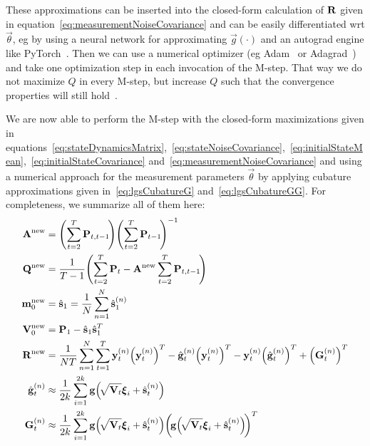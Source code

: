	These approximations can be inserted into the closed-form calculation of \(\boldsymbol{\mathrm{R}}\) given in equation~\eqref{eq:measurementNoiseCovariance} and can be easily differentiated \ac{wrt} \(\vec{\theta}\), \ac{eg} by using a neural network for approximating \(\vec{g}(\cdot)\) and an autograd engine like PyTorch~\cite{paszkePyTorchImperativeStyle2019}. Then we can use a numerical optimizer (\ac{eg} Adam~\cite{kingmaAdamMethodStochastic2017} or Adagrad~\cite{duchiAdaptiveSubgradientMethods2011}) and take one optimization step in each invocation of the M-step. That way we do not maximize \(Q\) in every M-step, but increase \(Q\) such that the convergence properties will still hold~\cite{moonExpectationmaximizationAlgorithm1996}.

	We are now able to perform the M-step with the closed-form maximizations given in equations~\eqref{eq:stateDynamicsMatrix},~\eqref{eq:stateNoiseCovariance},~\eqref{eq:initialStateMean},~\eqref{eq:initialStateCovariance} and~\eqref{eq:measurementNoiseCovariance} and using a numerical approach for the measurement parameters \(\vec{\theta}\) by applying cubature approximations given in~\eqref{eq:lgsCubatureG} and~\eqref{eq:lgsCubatureGG}. For completeness, we summarize all of them here:
	\begin{align*}
		\mat{A}^\new &= \Bigg(\! \sum_{t = 2}^{T} \mat{P}_{t, t - 1} \!\Bigg) \Bigg(\! \sum_{t = 2}^{T} \mat{P}_{t - 1} \!\Bigg)^{-1} \\
		\mat{Q}^\new &= \frac{1}{T - 1} \Bigg(\! \sum_{t = 2}^{T} \mat{P}_t - \mat{A}^\new \sum_{t = 2}^{T} \mat{P}_{t, t - 1} \!\Bigg) \\
		\vec{m}_0^\new &= \hat{\vec{s}}_1 = \frac{1}{N} \sum_{n = 1}^{N} \hat{\vec{s}}_1^{(n)} \\
		\mat{V}_0^\new &= \mat{P}_1 - \hat{\vec{s}}_1 \hat{\vec{s}}_1^T \\
		\mat{R}^\new &= \frac{1}{NT} \sum_{n = 1}^{N} \sum_{t = 1}^{T} \vec{y}_t^{(n)} \Big(\vec{y}_t^{(n)}\Big)^T - \hat{\vec{g}}_t^{(n)} \Big(\vec{y}_t^{(n)}\Big)^T - \vec{y}_t^{(n)} \Big(\hat{\vec{g}}_t^{(n)}\Big)^T + \Big(\mat{G}_t^{(n)}\Big)^T \\
		\hat{\vec{g}}_t^{(n)} &\approx \frac{1}{2k} \sum_{i = 1}^{2k} \vec{g}\Big(\!\sqrt{\mat{V}_t} \vec{\xi}_i + \hat{\vec{s}}_t^{(n)}\Big) \\
		\mat{G}_t^{(n)} &\approx \frac{1}{2k} \sum_{i = 1}^{2k} \vec{g}\Big(\!\sqrt{\mat{V}_t} \vec{\xi}_i + \hat{\vec{s}}_t^{(n)}\Big) \bigg(\!\vec{g}\Big(\!\sqrt{\mat{V}_t} \vec{\xi}_i + \hat{\vec{s}}_t^{(n)}\Big)\!\bigg)^T
	\end{align*}

